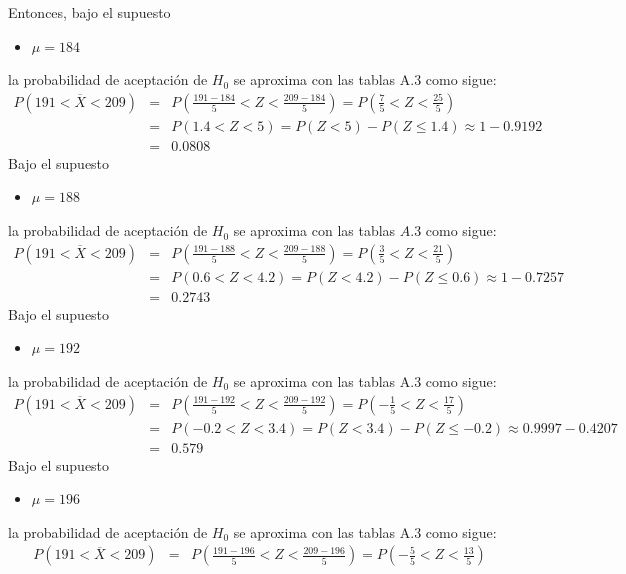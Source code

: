 \begin{solucion}
 \par 
 Entonces, bajo el supuesto
 \begin{itemize}
  \item $\mu = 184$
 \end{itemize}
 la probabilidad de aceptaci\'on de $H_0$ se aproxima con las tablas A.3 como sigue:
 \begin{eqnarray*}
  P\left(191 < \overline{X} < 209 \right) & = & P\left( \frac{191 - 184}{5} < Z < \frac{209 - 184}{5} \right) = P\left( \frac{7}{5} < Z < \frac{25}{5} \right) \\
  & = & P(1.4 < Z < 5) = P(Z < 5) - P(Z \leq 1.4) \approx 1 - 0.9192 \\
  & = & 0.0808
 \end{eqnarray*}
 Bajo el supuesto
 \begin{itemize}
  \item $\mu = 188$
 \end{itemize}
 la probabilidad de aceptaci\'on de $H_0$ se aproxima con las tablas $A.3$ como sigue:
 \begin{eqnarray*}
  P\left(191 < \overline{X} < 209 \right) & = & P\left( \frac{191 - 188}{5} < Z < \frac{209-188}{5} \right) = P\left( \frac{3}{5} < Z < \frac{21}{5} \right) \\
  & = & P(0.6 < Z < 4.2) = P(Z < 4.2) - P(Z \leq 0.6) \approx 1 - 0.7257 \\
  & = & 0.2743
 \end{eqnarray*}
 Bajo el supuesto
 \begin{itemize}
  \item $\mu = 192$
 \end{itemize}
 la probabilidad de aceptaci\'on de $H_0$ se aproxima con las tablas A.3 como sigue:
 \begin{eqnarray*}
  P\left(191 < \overline{X} < 209 \right) & = & P\left( \frac{191-192}{5} < Z < \frac{209 - 192}{5} \right) = P\left( -\frac{1}{5} < Z < \frac{17}{5} \right) \\
  & = & P(-0.2 < Z < 3.4) = P(Z < 3.4) - P(Z \leq -0.2) \approx 0.9997 - 0.4207 \\
  & = & 0.579
 \end{eqnarray*}
 Bajo el supuesto
 \begin{itemize}
  \item $\mu = 196$
 \end{itemize}
 la probabilidad de aceptaci\'on de $H_0$ se aproxima con las tablas A.3 como sigue:
 \begin{eqnarray*}
  P\left(191 < \overline{X} < 209 \right) & = & P\left( \frac{191-196}{5} < Z < \frac{209 - 196}{5} \right) = P\left( -\frac{5}{5} < Z < \frac{13}{5} \right) \\

\end{eqnarray*}
\end{solucion}
